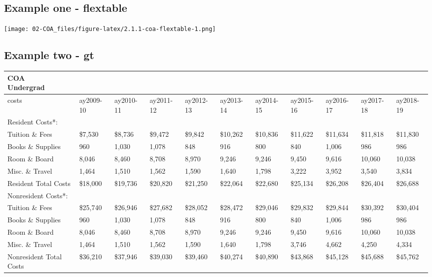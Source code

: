 \documentclass[
]{book}
\begin{document}
\hypertarget{example-one---flextable}{%
\subsection{Example one - flextable}\label{example-one---flextable}}

\texttt{[image: 02-COA\_files/figure-latex/2.1.1-coa-flextable-1.png]}

\hypertarget{example-two---gt}{%
\subsection{Example two - gt}\label{example-two---gt}}

\captionsetup[table]{labelformat=empty,skip=1pt}
\begin{longtable}{lllllllllll}
\caption*{
\large COA\\ 
\small Undergrad\\ 
} \\ 
\toprule
costs & ay2009-10 & ay2010-11 & ay2011-12 & ay2012-13 & ay2013-14 & ay2014-15 & ay2015-16 & ay2016-17 & ay2017-18 & ay2018-19 \\ 
\midrule
Resident Costs*: &  &  &  &  &  &  &  &  &  &  \\ 
Tuition \& Fees & \$7,530 & \$8,736 & \$9,472 & \$9,842 & \$10,262 & \$10,836 & \$11,622 & \$11,634 & \$11,818 & \$11,830 \\ 
Books \& Supplies & 960 & 1,030 & 1,078 & 848 & 916 & 800 & 840 & 1,006 & 986 & 986 \\ 
Room \& Board & 8,046 & 8,460 & 8,708 & 8,970 & 9,246 & 9,246 & 9,450 & 9,616 & 10,060 & 10,038 \\ 
Misc. \& Travel & 1,464 & 1,510 & 1,562 & 1,590 & 1,640 & 1,798 & 3,222 & 3,952 & 3,540 & 3,834 \\ 
Resident Total Costs & \$18,000 & \$19,736 & \$20,820 & \$21,250 & \$22,064 & \$22,680 & \$25,134 & \$26,208 & \$26,404 & \$26,688 \\ 
Nonresident Costs*: &  &  &  &  &  &  &  &  &  &  \\ 
Tuition \& Fees & \$25,740 & \$26,946 & \$27,682 & \$28,052 & \$28,472 & \$29,046 & \$29,832 & \$29,844 & \$30,392 & \$30,404 \\ 
Books \& Supplies & 960 & 1,030 & 1,078 & 848 & 916 & 800 & 840 & 1,006 & 986 & 986 \\ 
Room \& Board & 8,046 & 8,460 & 8,708 & 8,970 & 9,246 & 9,246 & 9,450 & 9,616 & 10,060 & 10,038 \\ 
Misc. \& Travel & 1,464 & 1,510 & 1,562 & 1,590 & 1,640 & 1,798 & 3,746 & 4,662 & 4,250 & 4,334 \\ 
Nonresident Total Costs & \$36,210 & \$37,946 & \$39,030 & \$39,460 & \$40,274 & \$40,890 & \$43,868 & \$45,128 & \$45,688 & \$45,762 \\ 
\bottomrule
\end{longtable}
\end{document}
